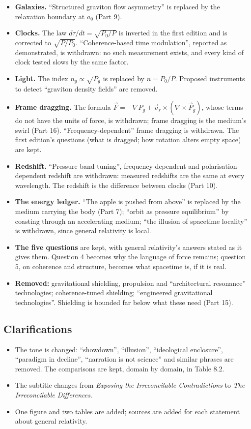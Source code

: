 \documentclass[11pt,a4paper]{article}
\begin{document}
\begin{itemize}
\item \textbf{Galaxies.} ``Structured graviton flow asymmetry'' is replaced by the relaxation boundary at $a_0$ (Part 9).
\item \textbf{Clocks.} The law $d\tau/dt = \sqrt{P_0/P}$ is inverted in the first edition and is corrected to $\sqrt{P/P_0}$. ``Coherence-based time modulation'', reported as demonstrated, is withdrawn: no such measurement exists, and every kind of clock tested slows by the same factor.
\item \textbf{Light.} The index $n_g \propto \sqrt{P_g}$ is replaced by $n = P_0/P$. Proposed instruments to detect ``graviton density fields'' are removed.
\item \textbf{Frame dragging.} The formula $\vec F = -\nabla P_g + \vec v_r \times (\nabla\times\vec P_g)$, whose terms do not have the units of force, is withdrawn; frame dragging is the medium's swirl (Part 16). ``Frequency-dependent'' frame dragging is withdrawn. The first edition's questions (what is dragged; how rotation alters empty space) are kept.
\item \textbf{Redshift.} ``Pressure band tuning'', frequency-dependent and polarisation-dependent redshift are withdrawn: measured redshifts are the same at every wavelength. The redshift is the difference between clocks (Part 10).
\item \textbf{The energy ledger.} ``The apple is pushed from above'' is replaced by the medium carrying the body (Part 7); ``orbit as pressure equilibrium'' by coasting through an accelerating medium; ``the illusion of spacetime locality'' is withdrawn, since general relativity is local.
\item \textbf{The five questions} are kept, with general relativity's answers stated as it gives them. Question 4 becomes why the language of force remains; question 5, on coherence and structure, becomes what spacetime is, if it is real.
\item \textbf{Removed:} gravitational shielding, propulsion and ``architectural resonance'' technologies; coherence-tuned shielding; ``engineered gravitational technologies''. Shielding is bounded far below what these need (Part 15).
\end{itemize}

\subsection*{Clarifications}
\begin{itemize}
\item The tone is changed: ``showdown'', ``illusion'', ``ideological enclosure'', ``paradigm in decline'', ``narration is not science'' and similar phrases are removed. The comparisons are kept, domain by domain, in Table 8.2.
\item The subtitle changes from \textit{Exposing the Irreconcilable Contradictions} to \textit{The Irreconcilable Differences}.
\item One figure and two tables are added; sources are added for each statement about general relativity.
\end{itemize}


\end{document}
